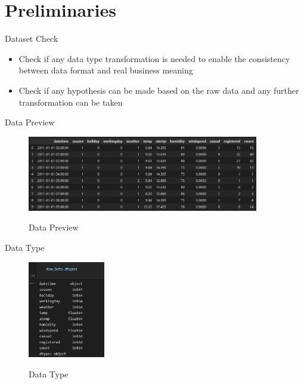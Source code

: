 \documentclass[
 size=14pt,
 paper=smartboard,  %
 mode=present, 		%
 display=slides, 	%
 style=tuliplab,  	%
 pauseslide,
 fleqn,leqno]{powerdot}
\begin{document}
\section{Preliminaries}

\begin{slide}{Dataset Check}
\begin{center}
    \begin{itemize}
    \item Check if any data type transformation is needed to enable the consistency between data format and real business meaning
    \item Check if any hypothesis can be made based on the raw data and any further transformation can be taken
    \end{itemize}
\end{center}
\bigskip
\end{slide}

\begin{slide}[toc=,bm=]{Data Preview}
\begin{center}
\begin{figure}
  \centering
  \includegraphics[width=0.9\textwidth]{figures/DataDescription.eps}\\
  \caption{Data Preview}\label{fig:dataPreview}
\end{figure}
\end{center}
\bigskip
\end{slide}

\begin{slide}[toc=,bm=]{Data Type}
\begin{center}
\begin{figure}
  \centering
  \includegraphics[width=0.3\textwidth]{figures/DataType.eps}\\
  \caption{Data Type}\label{fig:dataType}
\end{figure}
\end{center}
\bigskip
\end{slide}
\end{document}
